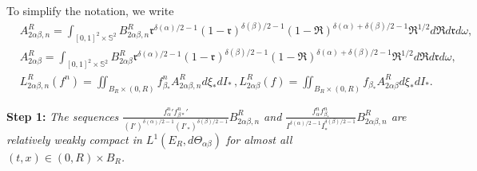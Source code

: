 \documentclass[reqno,11pt]{amsart}
\numberwithin{equation}{section}
\begin{document}
To simplify the notation, we write
\begin{align*}
	&A^R_{2\alpha \beta, n } = \int_{[0,1]^2 \times \mathbb{S}^2 } B^R_{2\alpha \beta, n } \mathfrak{r}^{\delta (\alpha)/2-1} (1-\mathfrak{r})^{\delta(\beta)/2-1}(1-\mathfrak{R})^{\delta(\alpha)+\delta(\beta)/2-1} \mathfrak{R}^{1/2}  d \mathfrak{R} d \mathfrak{r} d\omega,\\ 
	&A^R_{2\alpha \beta} = \int_{[0,1]^2 \times \mathbb{S}^2 } B^R_{2\alpha \beta} \mathfrak{r}^{\delta (\alpha)/2-1} (1-\mathfrak{r})^{\delta(\beta)/2-1}(1-\mathfrak{R})^{\delta(\alpha)+\delta(\beta)/2-1} \mathfrak{R}^{1/2}  d \mathfrak{R} d \mathfrak{r} d\omega,\\ 
	& L^R_{2\alpha \beta, n }(f^n)=\iint_{B_R\times(0,R)} f^n_{\beta_*} A^R_{2\alpha \beta, n }d\xi_* dI_* \,, L^R_{2\alpha \beta}(f)=\iint_{B_R\times(0,R)} f_{\beta_*} A^R_{2\alpha \beta}d\xi_* dI_*.
\end{align*}

{\bf Step 1:} {\em The sequences $   \frac{ {f_\alpha^n}' {f_{\beta *}^n}' }{(I')^{\delta(\alpha)/2-1} (I'_* )^{\delta(\beta)/2-1}} B^R_{2 \alpha \beta, n}$ and $  \frac{f^n_\alpha f^n_{\beta_* }}{I^{\delta(\alpha)/2-1} I_* ^{\delta(\beta)/2-1}} B^R_{2 \alpha \beta, n}$ are relatively weakly compact in $L^1(E_R,d \Theta_{\alpha \beta}  )$ for almost all $(t,x) \in (0,R) \times   B_R$.}
\end{document}
